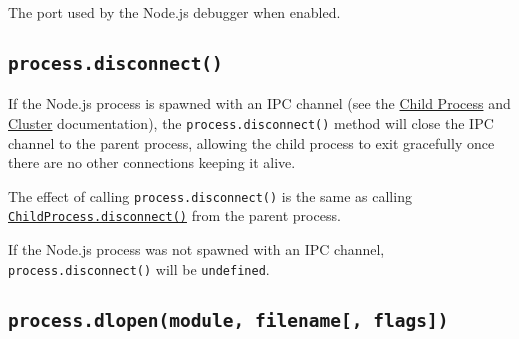 The port used by the Node.js debugger when enabled.

\begin{Shaded}
\begin{Highlighting}[]
   \OperatorTok{;}

 \OperatorTok{=} \OperatorTok{;}
\end{Highlighting}
\end{Shaded}

\begin{Shaded}
\begin{Highlighting}[]
  \OperatorTok{=} \NormalTok{(}\NormalTok{)}\OperatorTok{;}

 \OperatorTok{=} \OperatorTok{;}
\end{Highlighting}
\end{Shaded}

\subsection{\texorpdfstring{\texttt{process.disconnect()}}{process.disconnect()}}\label{process.disconnect}

If the Node.js process is spawned with an IPC channel (see the
\href{child_process.md}{Child Process} and \href{cluster.md}{Cluster}
documentation), the \texttt{process.disconnect()} method will close the
IPC channel to the parent process, allowing the child process to exit
gracefully once there are no other connections keeping it alive.

The effect of calling \texttt{process.disconnect()} is the same as
calling
\href{child_process.md\#subprocessdisconnect}{\texttt{ChildProcess.disconnect()}}
from the parent process.

If the Node.js process was not spawned with an IPC channel,
\texttt{process.disconnect()} will be \texttt{undefined}.

\subsection{\texorpdfstring{\texttt{process.dlopen(module,\ filename{[},\ flags{]})}}{process.dlopen(module, filename{[}, flags{]})}}\label{process.dlopenmodule-filename-flags}

